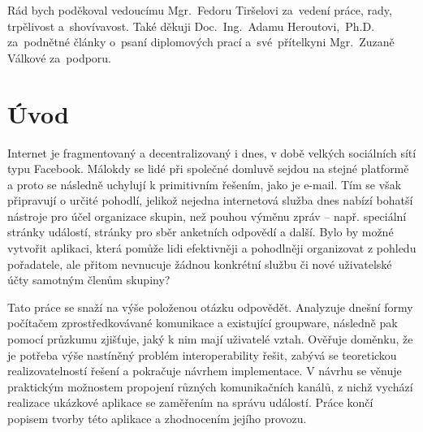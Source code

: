 \documentclass[12pt,oneside,final]{fithesis2}
\begin{document}
\FrontMatter
\ThesisTitlePage



\begin{ThesisDeclaration}
\DeclarationText
\AdvisorName
\end{ThesisDeclaration}



\begin{ThesisThanks}
Rád bych poděkoval vedoucímu Mgr.~Fedoru Tiršelovi za~vedení práce, rady, trpělivost a~shovívavost. Také děkuji Doc.~Ing.~Adamu Heroutovi,~Ph.D. za~podnětné články o~psaní diplomových prací a~své~přítelkyni Mgr.~Zuzaně Válkové za~podporu.
\end{ThesisThanks}









\tableofcontents
\listoffigures



\MainMatter



\chapter{Úvod}\label{introduction}
Internet je fragmentovaný a decentralizovaný i dnes, v době velkých sociálních sítí typu Facebook. Málokdy se lidé při společné domluvě sejdou na stejné platformě a proto se následně uchylují k primitivním řešením, jako je e-mail. Tím se však připravují o určité pohodlí, jelikož nejedna internetová služba dnes nabízí bohatší nástroje pro účel organizace skupin, než pouhou výměnu zpráv -- např. speciální stránky událostí, stránky pro sběr anketních odpovědí a další. Bylo by možné vytvořit aplikaci, která pomůže lidi efektivněji a pohodlněji organizovat z pohledu pořadatele, ale přitom nevnucuje žádnou konkrétní službu či nové uživatelské účty samotným členům skupiny?

Tato práce se snaží na výše položenou otázku odpovědět. Analyzuje dnešní formy počítačem zprostředkovávané komunikace a existující groupware, následně pak pomocí průzkumu zjišťuje, jaký k nim mají uživatelé vztah. Ověřuje doměnku, že je potřeba výše nastíněný problém interoperability řešit, zabývá se teoretickou realizovatelností řešení a pokračuje návrhem implementace. V návrhu se věnuje praktickým možnostem propojení různých komunikačních kanálů, z nichž vychází realizace ukázkové aplikace se zaměřením na správu událostí. Práce končí popisem tvorby této aplikace a zhodnocením jejího provozu.
\end{document}
